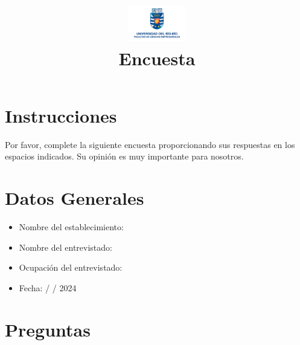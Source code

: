 \documentclass{article}
\title{
    \vspace{-2cm}
    \includegraphics[width=2.5cm]{img/logo-ubb-txt-face.png}\\[0cm] %
    \textbf{Encuesta}
    \vspace{-1.5cm}
}
\author{}
\date{}
\begin{document}
\maketitle

\section*{Instrucciones}
Por favor, complete la siguiente encuesta proporcionando sus respuestas en los espacios indicados. Su opinión es muy importante para nosotros.

\section*{Datos Generales}
\begin{itemize}
    \item Nombre del establecimiento: \underline{\hspace{0.6\linewidth}}
    \item Nombre del entrevistado: \underline{\hspace{0.63\linewidth}}
    \item Ocupación del entrevistado: \underline{\hspace{0.6021\linewidth}}
    \item Fecha: \hspace*{0.5cm} / \hspace*{0.5cm} / 2024
\end{itemize}

\section*{Preguntas}
\end{document}
